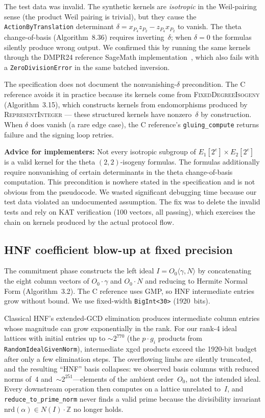 The test data was invalid.  The synthetic kernels are
\emph{isotropic} in the Weil-pairing sense (the product Weil
pairing is trivial), but they cause the
\texttt{ActionByTranslation} determinant $\delta = x_{P_4} z_{P_2}
- z_{P_4} x_{P_2}$ to vanish.  The theta change-of-basis
(Algorithm~8.36) requires inverting~$\delta$; when $\delta = 0$ the
formulas silently produce wrong output.  We confirmed this by
running the same kernels through the DMPR24 reference SageMath
implementation~\cite{AC:DMPR24}, which also fails with a
\texttt{ZeroDivisionError} in the same batched inversion.

The specification does not document the nonvanishing-$\delta$
precondition.  The C reference avoids it in practice because its
kernels come from \textsc{FixedDegreeIsogeny} (Algorithm~3.15),
which constructs kernels from endomorphisms produced by
\textsc{RepresentInteger} --- these structured kernels have
nonzero~$\delta$ by construction.  When $\delta$ does vanish (a
rare edge case), the C reference's \texttt{gluing\_compute}
returns failure and the signing loop retries.

\noindent
\textbf{Advice for implementers:} Not every isotropic subgroup of
$E_1[2^e] \times E_2[2^e]$ is a valid kernel for the theta
$(2,2)$-isogeny formulas.  The formulas additionally require
nonvanishing of certain determinants in the theta change-of-basis
computation.  This precondition is nowhere stated in the
specification and is not obvious from the pseudocode.  We wasted
significant debugging time because our test data violated an
undocumented assumption.  The fix was to delete the invalid tests
and rely on KAT verification (100 vectors, all passing), which
exercises the chain on kernels produced by the actual protocol
flow.

\subsection{HNF coefficient blow-up at fixed precision}
\label{sec:bug-hnf}

The commitment phase constructs the left ideal
$I = O_0\langle\gamma, N\rangle$ by concatenating the eight column
vectors of $O_0 \cdot \gamma$ and $O_0 \cdot N$ and reducing to
Hermite Normal Form (Algorithm~3.2).  The C reference uses GMP, so
HNF intermediate entries grow without bound.  We use fixed-width
\texttt{BigInt<30>} (1920~bits).

Classical HNF's extended-GCD elimination produces intermediate
column entries whose magnitude can grow exponentially in the rank.
For our rank-4 ideal lattices with initial entries up to
${\sim}2^{770}$ (the $p \cdot g_i$ products from
\texttt{RandomIdealGivenNorm}), intermediate xgcd products exceed
the 1920-bit budget after only a few elimination steps.  The
overflowing limbs are silently truncated, and the resulting ``HNF''
basis collapses: we observed basis columns with reduced norms of~4
and~${\sim}2^{251}$---elements of the ambient order~$O_0$, not
the intended ideal.  Every downstream operation then computes on
a lattice unrelated to~$I$, and
\texttt{reduce\_to\_prime\_norm} never finds a valid prime because
the divisibility invariant $\mathrm{nrd}(\alpha) \in N(I) \cdot
\mathbb{Z}$ no longer holds.

